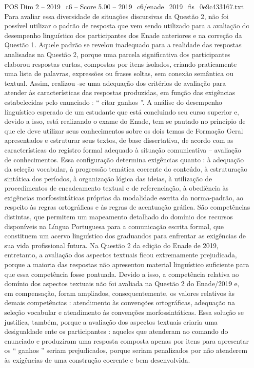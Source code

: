 \begin{textsample}{POS Dim 2 – 2019\_c6 – Score 5.00 – 2019\_c6/enade\_2019\_fis\_0e9c433167.txt}
Para avaliar essa diversidade de situações discursivas da Questão 2, não foi possível utilizar o padrão de resposta que vem sendo utilizado para a avaliação do desempenho linguístico dos participantes dos Enade anteriores e na correção da Questão 1.
Aquele padrão se revelou inadequado para a realidade das respostas analisadas na Questão 2, porque uma parcela significativa dos participantes elaborou respostas curtas, compostas por itens isolados, criando praticamente uma lista de palavras, expressões ou frases soltas, sem conexão semântica ou textual.
Assim, realizou -se uma adequação dos critérios de avaliação para atender às características das respostas produzidas, em função das exigências estabelecidas pelo enunciado : “ citar ganhos ”.
A análise do desempenho linguístico esperado de um estudante que está concluindo seu curso superior e, devido a isso, está realizando o exame do Enade, tem se pautado no princípio de que ele deve utilizar seus conhecimentos sobre os dois temas de Formação Geral apresentados e estruturar seus textos, de base dissertativa, de acordo com as características do registro formal adequado à situação comunicativa – avaliação de conhecimentos.
Essa configuração determina exigências quanto : à adequação da seleção vocabular, à progressão temática coerente do conteúdo, à estruturação sintática dos períodos, à organização lógica das ideias, à utilização de procedimentos de encadeamento textual e de referenciação, à obediência às exigências morfossintáticas próprias da modalidade escrita da norma-padrão, ao respeito às regras ortográficas e às regras de acentuação gráfica.
São competências distintas, que permitem um mapeamento detalhado do domínio dos recursos disponíveis na Língua Portuguesa para a comunicação escrita formal, que constituem um acervo linguístico dos graduandos para enfrentar as exigências de sua vida profissional futura.
Na Questão 2 da edição do Enade de 2019, entretanto, a avaliação dos aspectos textuais ficou extremamente prejudicada, porque a maioria das respostas não apresentou material linguístico suficiente para que essa competência fosse pontuada.
Devido a isso, a competência relativa ao domínio dos aspectos textuais não foi avaliada na Questão 2 do Enade/2019 e, em compensação, foram ampliados, consequentemente, os valores relativos às demais competências : atendimento às convenções ortográficas, adequação na seleção vocabular e atendimento às convenções morfossintáticas.
Essa solução se justifica, também, porque a avaliação dos aspectos textuais criaria uma desigualdade ente os participantes : aqueles que atenderam ao comando do enunciado e produziram uma resposta composta apenas por itens para apresentar os “ ganhos ” seriam prejudicados, porque seriam penalizados por não atenderem às exigências de uma construção coerente e bem desenvolvida.

\end{textsample}
